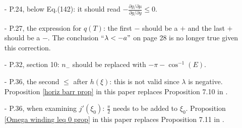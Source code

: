 \documentclass[11 pt]{article}
\renewcommand\l{\lambda}
\renewcommand\({\left(}
\renewcommand\){\right)}
\newcommand\<{\langle}
\renewcommand\>{\rangle}
\renewcommand\l{\lambda}
\newcommand\8{\infty}
\newcommand{\pd}{\partial}
\begin{document}
\begin{itemize}
\item[-] P.24, below Eq.(142): it should read $-\frac{\pd g/\pd \mu}{\pd g/ \pd y} \leq 0$. 
\item[-] P.27, the expression for $q(T)$: the first $-$ should be a $+$ and the last $+$ should be a $-$. The conclusion ``$\lambda < -a"$ on page 28 is no longer true given this correction.
\item[-] P.32, section 10: $n_-$ should be replaced with $-\pi - \cos^{-1}(E)$. 
\item[-] P.36, the second $\leq$ after $h(\xi)$: this is not valid since $\l$ is negative. Proposition \ref{horiz barr prop} in this paper replaces Proposition 7.10 in \cite{KTZzGKNDa}.

\item[-] P.36, when examining $j'(\xi_0)$: $\frac{\pi}{2}$ needs to be added to $\xi_0$. Proposition \ref{Omega winding leq 0 prop} in this paper replaces Proposition 7.11 in \cite{KTZzGKNDa}.

\end{itemize}
\end{document}
